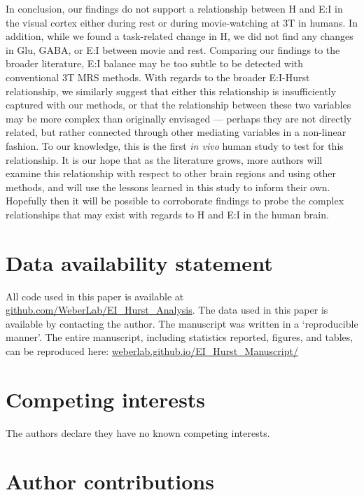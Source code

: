 \documentclass[
true
]{sn-jnl}
\begin{document}
In conclusion, our findings do not support a relationship between H and
E:I in the visual cortex either during rest or during movie-watching at
3T in humans. In addition, while we found a task-related change in H, we
did not find any changes in Glu, GABA, or E:I between movie and rest.
Comparing our findings to the broader literature, E:I balance may be too
subtle to be detected with conventional 3T MRS methods. With regards to
the broader E:I-Hurst relationship, we similarly suggest that either
this relationship is insufficiently captured with our methods, or that
the relationship between these two variables may be more complex than
originally envisaged --- perhaps they are not directly related, but
rather connected through other mediating variables in a non-linear
fashion. To our knowledge, this is the first \emph{in vivo} human study
to test for this relationship. It is our hope that as the literature
grows, more authors will examine this relationship with respect to other
brain regions and using other methods, and will use the lessons learned
in this study to inform their own. Hopefully then it will be possible to
corroborate findings to probe the complex relationships that may exist
with regards to H and E:I in the human brain.

\section*{Data availability
statement}\label{data-availability-statement}

All code used in this paper is available at
\href{https://github.com/WeberLab/EI_Hurst_Analysis}{github.com/WeberLab/EI\_Hurst\_Analysis}.
The data used in this paper is available by contacting the author. The
manuscript was written in a `reproducible manner'. The entire
manuscript, including statistics reported, figures, and tables, can be
reproduced here:
\href{https://weberlab.github.io/EI_Hurst_Manuscript/}{weberlab.github.io/EI\_Hurst\_Manuscript/}

\section*{Competing interests}\label{competing-interests}

The authors declare they have no known competing interests.

\section*{Author contributions}\label{author-contributions}
\end{document}
